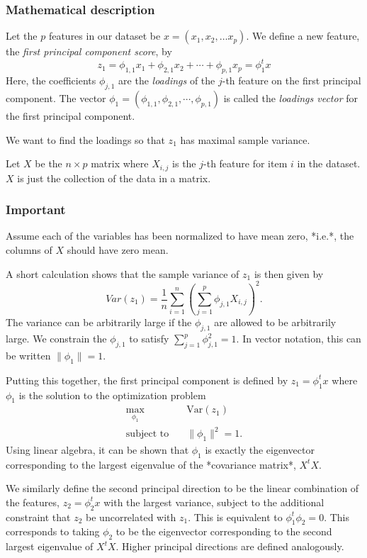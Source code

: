 \documentclass{article}
\begin{document}
\subsubsection{Mathematical description} Let the $p$ features in our dataset be $x = (x_1, x_2, \ldots x_p)$. We define a new feature, the \textit{first principal component score}, by 
$$
z_1 = \phi_{1,1} x_1 + \phi_{2,1} x_2 + \cdots + \phi_{p,1} x_p = \phi_1^t x 
$$
Here, the coefficients $\phi_{j,1}$ are the \textit{loadings} of the $j$-th feature on the first principal component. The vector $\phi_1 = (\phi_{1,1}, \phi_{2,1},\cdots, \phi_{p,1})$ is called the \textit{loadings vector} for the first principal component. 

We want to find the loadings so that $z_1$ has maximal sample variance. 

Let $X$ be the $n\times p$ matrix where $X_{i,j}$ is the $j$-th feature for item $i$ in the dataset. $X$ is just the collection of the data in a matrix. 

\subsubsection{Important} Assume each of the variables has been normalized to have mean zero, *i.e.*, the columns of $X$ should have zero mean. 

A short calculation shows that the sample variance of $z_1$ is then given by 
$$
Var(z_1) = \frac{1}{n} \sum_{i=1}^n \left( \sum_{j=1}^p \phi_{j,1} X_{i,j} \right)^2. 
$$
The variance can be arbitrarily large if the $\phi_{j,1}$ are allowed to be arbitrarily large. We constrain the $\phi_{j,1}$ to satisfy $\sum_{j=1}^p \phi_{j,1}^2 = 1$. In vector notation, this can be written $\| \phi_1 \| = 1$.

Putting this together, the first principal component is defined by $z_1 = \phi_1^t x$ where $\phi_1$ is the solution to the optimization problem 
\begin{align*}
\max_{\phi_1} \quad & \textrm{Var}(z_1) \\
\text{subject to} \quad & \| \phi_1\|^2 = 1. 
\end{align*}
Using linear algebra, it can be shown that $\phi_1$ is exactly the eigenvector corresponding to the largest eigenvalue of the *covariance matrix*, $X^tX$. 

We similarly define the second principal direction to be the linear combination of the features, 
$z_2 = \phi_2^t x$ with the largest variance, subject to the additional constraint that $z_2$ be uncorrelated with $z_1$. This is equivalent to $\phi_1^t \phi_2 = 0$. This corresponds to taking $\phi_2$ to be the eigenvector corresponding to the second largest eigenvalue of $X^tX$. Higher principal directions are defined analogously. 
\end{document}
